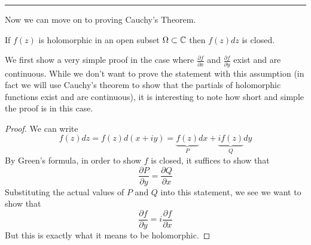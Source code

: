\begin{center}
    \rule{2cm}{0.4pt}
\end{center}

Now we can move on to proving Cauchy's Theorem. 
\begin{theorem}\label{thm:cauchy-thm}
If $f(z)$ is holomorphic in an open subset $\Omega \subset \mathbb{C}$ then $f(z)dz$ is closed.
\end{theorem}
We first show a very simple proof in the case where $\frac{\partial f}{\partial x}$ and $\frac{\partial f}{\partial y}$ exist and are continuous. While we don't want to prove the statement with this assumption (in fact we will use Cauchy's theorem to show that the partials of holomorphic functions exist and are continuous), it is interesting to note how short and simple the proof is in this case.
\begin{proof}
We can write
$$ f(z) dz = f(z) d(x + iy) = \underbrace{f(z)}_P dx + \underbrace{if(z)}_Q dy $$
By Green's formula, in order to show $f$ is closed, it suffices to show that
$$ \frac{\partial P}{\partial y} = \frac{\partial Q}{\partial x} $$
Substituting the actual values of $P$ and $Q$ into this statement, we see we want to show that
$$ \frac{\partial f}{\partial y} = i \frac{\partial f}{\partial x} $$
But this is exactly what it means to be holomorphic. 
\end{proof}


